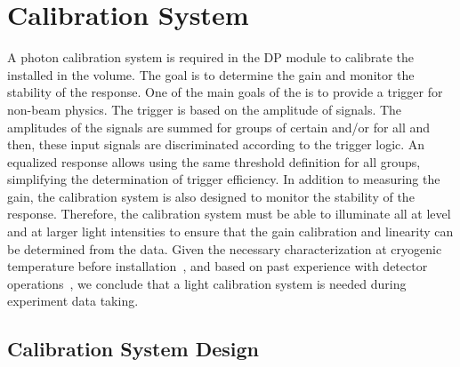 \section{Calibration System}
\label{sec:dp-pds-calibration}

A photon calibration system is required in the DP module to calibrate the  installed in the  volume. The goal is to determine the  gain and monitor the stability of the  response. One of the main goals of the  is to provide a trigger for non-beam physics. The trigger is based on the amplitude of  signals. The amplitudes of the  signals are summed for groups of certain  and/or for all  and then, these input signals are discriminated according to the trigger logic. An equalized  response allows using the same threshold definition for all  groups, simplifying the determination of trigger efficiency. In addition to measuring the  gain, the calibration system is also designed to monitor the stability of the  response. %
Therefore, the calibration system must be able to illuminate all  at  level and at larger light intensities to ensure that the gain calibration and linearity can be determined from the data. Given the necessary  characterization at cryogenic temperature before installation~\cite{Belver:2018erf}, and based on past experience with  detector operations~\cite{Aimard:2018yxp}, we conclude that a light calibration system is needed during experiment data taking.


\subsection{Calibration System Design}

